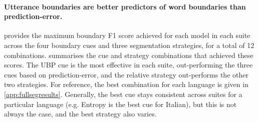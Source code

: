 




\paragraph{Utterance boundaries are better predictors of word boundaries than prediction-error.}
 provides the maximum boundary F1 score achieved for each model in each suite across the four boundary cues and three segmentation strategies, for a total of 12 combinations.  summarises the cue and strategy combinations that achieved these scores. The UBP cue is the most effective in each suite, out-performing the three cues based on prediction-error, and the relative strategy out-performs the other two strategies. For reference, the best combination for each language is given in \cref{app:fullsegresults}. Generally, the best cue stays consistent across suites for a particular language (e.g. Entropy is the best cue for Italian), but this is not always the case, and the best strategy also varies. %

